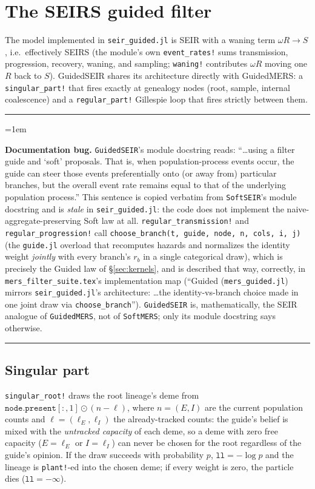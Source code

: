 \documentclass[11pt]{article}
\theoremstyle{plain}
\newenvironment{notebox}{%
  \par\addvspace{8pt}\noindent%
  {\color{chline}\rule{\linewidth}{0.8pt}}\par\smallskip%
  \begingroup\color{chline!40!black}%
  \leftskip=1em\relax
}{%
  \par\endgroup\smallskip%
  {\color{chline}\rule{\linewidth}{0.8pt}}\par\addvspace{8pt}%
}
\begin{document}
\section{The SEIRS guided filter}
\label{sec:seir}

The model implemented in \texttt{seir\_guided.jl} is SEIR with a waning term $\omega R\to S$, i.e.\
effectively SEIRS (the module's own \texttt{event\_rates!} sums transmission, progression,
recovery, waning, and sampling; \texttt{waning!} contributes $\omega R$ moving one $R$ back to
$S$). GuidedSEIR shares its architecture directly with GuidedMERS: a \texttt{singular\_part!} that
fires exactly at genealogy nodes (root, sample, internal coalescence) and a \texttt{regular\_part!}
Gillespie loop that fires strictly between them.

\begin{notebox}
\textbf{Documentation bug.} \texttt{GuidedSEIR}'s module docstring reads: ``\ldots using a filter
guide and `soft' proposals. That is, when population-process events occur, the guide can steer
those events preferentially onto (or away from) particular branches, but the overall event rate
remains equal to that of the underlying population process.'' This sentence is copied verbatim
from \texttt{SoftSEIR}'s module docstring and is \emph{stale} in \texttt{seir\_guided.jl}: the code
does not implement the naive-aggregate-preserving Soft law at all. \texttt{regular\_transmission!}
and \texttt{regular\_progression!} call \texttt{choose\_branch(t, guide, node, n, cols, i, j)}
(the \texttt{guide.jl} overload that recomputes hazards and normalizes the identity weight
\emph{jointly} with every branch's $r_b$ in a single categorical draw), which is precisely the
Guided law of \S\ref{sec:kernels}, and is described that way, correctly, in
\texttt{mers\_filter\_suite.tex}'s implementation map (``Guided (\texttt{mers\_guided.jl}) mirrors
\texttt{seir\_guided.jl}'s architecture: \ldots the identity-vs-branch choice made in one joint draw
via \texttt{choose\_branch}''). \texttt{GuidedSEIR} is, mathematically, the SEIR analogue of
\texttt{GuidedMERS}, not of \texttt{SoftMERS}; only its module docstring says otherwise.
\end{notebox}

\subsection{Singular part}

\texttt{singular\_root!} draws the root lineage's deme from
$\texttt{node.present}[:,1]\odot(n-\ell)$, where $n=(E,I)$ are the current population counts and
$\ell=(\ell_E,\ell_I)$ the already-tracked counts: the guide's belief is mixed with the
\emph{untracked capacity} of each deme, so a deme with zero free capacity ($E=\ell_E$ or
$I=\ell_I$) can never be chosen for the root regardless of the guide's opinion. If the draw
succeeds with probability $p$, $\texttt{ll} = -\log p$ and the lineage is \texttt{plant!}-ed into
the chosen deme; if every weight is zero, the particle dies ($\texttt{ll}=-\infty$).
\end{document}
